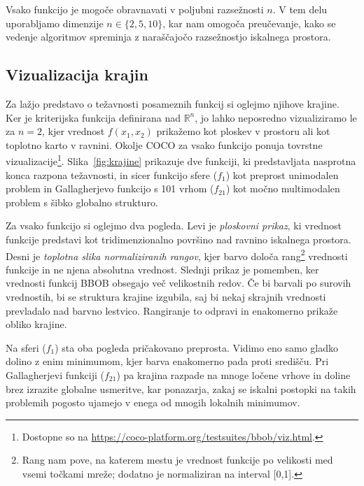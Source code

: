 \documentclass[a4paper, 12pt]{book}
\begin{document}
Vsako funkcijo je mogoče obravnavati v poljubni razsežnosti $n$. V tem delu
uporabljamo dimenzije $n \in \{2, 5, 10\}$, kar nam omogoča preučevanje, kako
se vedenje algoritmov spreminja z naraščajočo razsežnostjo iskalnega prostora.

\subsection{Vizualizacija krajin}
\label{subsec:krajine}

Za lažjo predstavo o težavnosti posameznih funkcij si oglejmo njihove krajine.
Ker je kriterijska funkcija definirana nad $\mathbb{R}^n$, jo lahko neposredno
vizualiziramo le za $n = 2$, kjer vrednost $f(x_1, x_2)$ prikažemo kot ploskev
v prostoru ali kot toplotno karto v ravnini. Okolje COCO za vsako funkcijo
ponuja tovrstne vizualizacije\footnote{Dostopne so na
\url{https://coco-platform.org/testsuites/bbob/viz.html}.}.
Slika~\ref{fig:krajine} prikazuje dve funkciji, ki predstavljata nasprotna
konca razpona težavnosti, in sicer funkcijo sfere ($f_1$) kot preprost unimodalen
problem in Gallagherjevo funkcijo s 101 vrhom ($f_{21}$) kot močno multimodalen
problem s šibko globalno strukturo.

Za vsako funkcijo si oglejmo dva pogleda. Levi je \emph{ploskovni prikaz}, ki
vred\-nost funkcije predstavi kot tridimenzionalno površino nad ravnino iskalnega
prostora. Desni je \emph{toplotna slika normaliziranih rangov}, kjer barvo
določa rang\footnote{Rang nam pove, na katerem mestu je vrednost funkcije po velikosti med vsemi točkami mreže; dodatno je normaliziran na interval [0,1].} vrednosti funkcije in ne njena absolutna vrednost. Slednji prikaz
je pomemben, ker vrednosti funkcij BBOB obsegajo več velikostnih redov. Če bi
barvali po surovih vrednostih, bi se struktura krajine izgubila, saj bi nekaj
skrajnih vrednosti prevladalo nad barvno lestvico. Rangiranje to odpravi in
enakomerno prikaže obliko krajine.

Na sferi ($f_1$) sta oba pogleda pričakovano preprosta. Vidimo eno samo gladko
dolino z enim minimumom, kjer barva enakomerno pada proti središču. Pri
Gallagherjevi funkciji ($f_{21}$) pa krajina razpade na mnoge ločene vrhove
in doline brez izrazite globalne usmeritve, kar ponazarja, zakaj se iskalni
postopki na takih problemih pogosto ujamejo v enega od mnogih lokalnih
minimumov.
\end{document}
